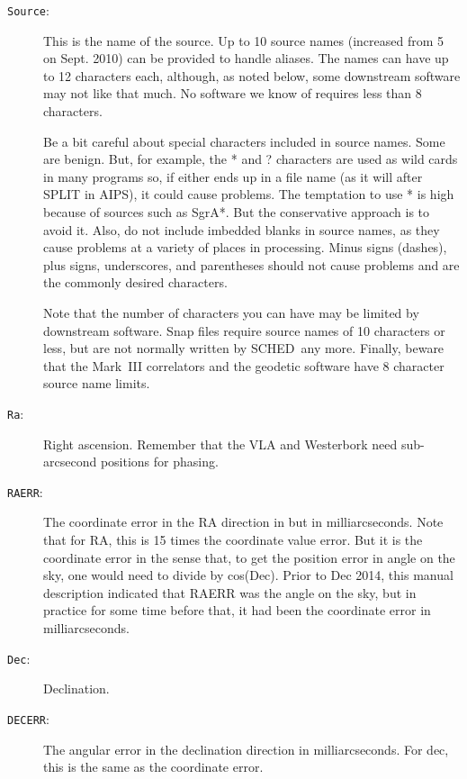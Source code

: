 \documentclass{report}
\newcommand{\schedb}{{\sc SCHED~}}
\begin{document}
\begin{description}

\item [{\tt Source}:] This is the name of the source.  Up to 10 source
names (increased from 5 on Sept. 2010) can be provided to handle
aliases.  The names can have up to 12 characters each, although, as
noted below, some downstream software may not like that much.  No
software we know of requires less than 8 characters.

Be a bit careful about special characters included in source names.
Some are benign.  But, for example, the * and ? characters are used as
wild cards in many programs so, if either ends up in a file name (as
it will after SPLIT in AIPS), it could cause problems.  The temptation
to use * is high because of sources such as SgrA*.  But the
conservative approach is to avoid it.  Also, do not include imbedded
blanks in source names, as they cause problems at a variety of places
in processing.  Minus signs (dashes), plus signs, underscores, and
parentheses should not cause problems and are the commonly desired
characters.

Note that the number of characters you can have may be limited by
downstream software.  Snap files require source names of 10 characters
or less, but are not normally written by \schedb any more.
Finally, beware that the Mark~III correlators and the geodetic
software have 8 character source name limits.

\item [{\tt Ra}:] Right ascension. Remember that the VLA and
Westerbork need sub-arcsecond positions for phasing.

\item [{\tt RAERR}:] The coordinate error in the RA direction in but
in milliarcseconds.  Note that for RA, this is 15 times the coordinate
value error.  But it is the coordinate error in the sense that, to get
the position error in angle on the sky, one would need to divide by
cos(Dec).  Prior to Dec 2014, this manual description indicated that
RAERR was the angle on the sky, but in practice for some time before
that, it had been the coordinate error in milliarcseconds.

\item [{\tt Dec}:] Declination.

\item [{\tt DECERR}:] The angular error in the declination direction in
milliarcseconds.  For dec, this is the same as the coordinate error.


\end{description}
\end{document}
